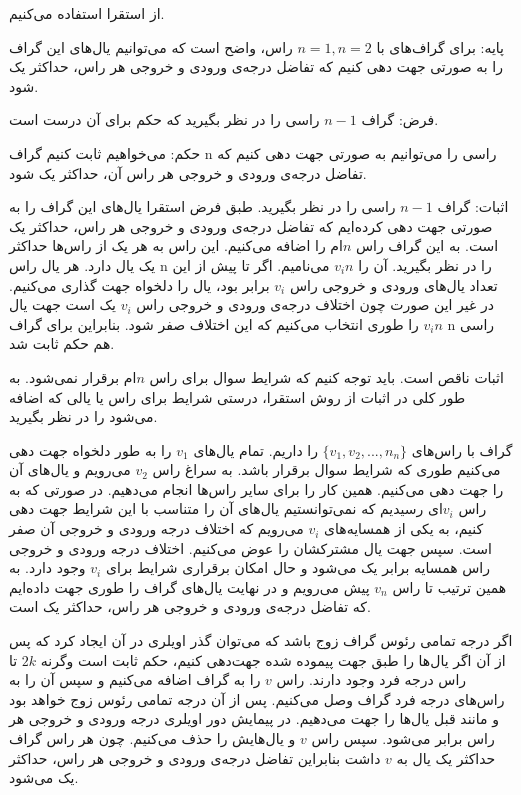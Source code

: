 \documentclass[11pt,largemargins]{h2wp}
\begin{document}
   
 \solution
از استقرا استفاده می‌کنیم.

پایه: برای گراف‌های با $ n = 1 , n=2 $ راس، واضح است که می‌توانیم یال‌های این گراف را به صورتی جهت ‌دهی کنیم که تفاضل درجه‌ی ورودی و خروجی هر راس، حداکثر یک شود.

فرض: گراف $n-1 $ راسی را در نظر بگیرید که حکم برای آن درست است.

حکم: می‌خواهیم ثابت کنیم گراف n راسی را می‌توانیم به صورتی جهت ‌دهی کنیم که تفاضل درجه‌ی ورودی و خروجی هر راس آن، حداکثر یک شود. 
   
   اثبات: گراف $n-1 $ راسی را در نظر بگیرید. طبق فرض استقرا یال‌های این گراف را به صورتی جهت ‌دهی کرده‌ایم که تفاضل درجه‌ی ورودی و خروجی هر راس، حداکثر یک است. به این گراف راس $ n$ام را اضافه می‌کنیم. این راس به هر یک از راس‌ها حداکثر یک یال دارد.  هر یال راس n را در نظر بگیرید. آن را $v_in$ می‌نامیم. اگر تا پیش از این تعداد یال‌های ورودی و خروجی راس $v_i$ برابر بود، یال را دلخواه جهت گذاری می‌کنیم. در غیر این صورت چون اختلاف درجه‌ی ورودی و خروجی راس $v_i$ یک است جهت یال $v_in$ را طوری انتخاب می‌کنیم که این اختلاف صفر شود.
 بنابراین برای گراف n راسی هم حکم ثابت شد.  
   \notes
   
   اثبات ناقص است. باید توجه کنیم که شرایط سوال برای راس $ n$ام برقرار نمی‌شود. به طور کلی در اثبات از روش استقرا، درستی شرایط برای راس یا یالی که اضافه می‌شود را در نظر بگیرید.
     
    \solution
    گراف با راس‌های $\{ v_1, v_2, ... , n_n \}$ را داریم. تمام یال‌های $v_1 $ را به طور دلخواه جهت دهی می‌کنیم طوری که شرایط سوال برقرار باشد. به سراغ راس
     $ v_2 $  
    می‌رویم و یال‌های آن را جهت دهی می‌کنیم. همین کار را برای سایر راس‌ها انجام می‌دهیم. در صورتی که به راس $v_i$ای رسیدیم که نمی‌توانستیم یال‌های آن را متناسب با این شرایط جهت دهی کنیم، به یکی از همسایه‌های  $v_i$ می‌رویم که اختلاف درجه ورودی و خروجی آن صفر است. سپس جهت یال مشترکشان را عوض می‌کنیم. اختلاف درجه ورودی و خروجی راس همسایه برابر یک می‌شود و حال امکان برقراری شرایط برای $v_i$ وجود دارد. به همین ترتیب تا راس $ v_n $ پیش می‌رویم و در نهایت یال‌های گراف را طوری جهت داده‌ایم که تفاضل درجه‌ی ورودی و خروجی هر راس، حداکثر یک است.
    
    \notes
    
    
        
    
    اگر درجه تمامی رئوس گراف زوج باشد که می‌توان گذر اویلری در آن ایجاد کرد که پس از آن اگر یال‌ها را طبق جهت پیموده شده جهت‌دهی کنیم، حکم ثابت است وگرنه $2k$ تا راس درجه فرد وجود دارند. راس $v$ را به گراف اضافه می‌کنیم و سپس آن را به راس‌های درجه فرد گراف وصل می‌کنیم. پس از آن درجه تمامی رئوس زوج خواهد بود و مانند قبل یال‌ها را جهت می‌دهیم. در پیمایش دور اویلری درجه ورودی و خروجی هر راس برابر می‌شود. سپس راس  $v$ و یال‌هایش را حذف می‌کنیم. چون هر راس گراف حداکثر یک یال به $v$ داشت بنابراین تفاضل درجه‌ی ورودی و خروجی هر راس، حداکثر یک می‌شود.
 
\end{document}
